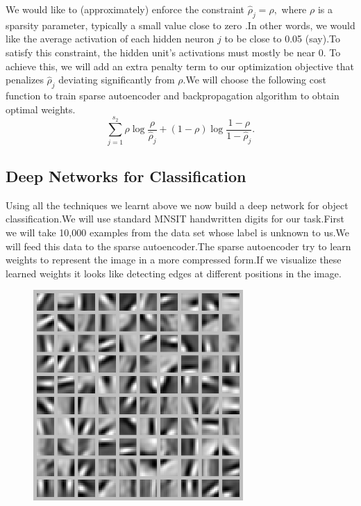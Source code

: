 \documentclass[18pt,letterpaper]{article}
\begin{document}
We would like to (approximately) enforce the constraint
$ \hat\rho_j = \rho,$
where $\textstyle \rho$ is a sparsity parameter, typically a small value close to zero
.In other words, we would like the average activation
of each hidden neuron $\textstyle j$ to be close to 0.05 (say).To satisfy this
constraint, the hidden unit's activations must mostly be near 0.
To achieve this, we will add an extra penalty term to our optimization objective that
penalizes $\textstyle \hat\rho_j$ deviating significantly from $\textstyle \rho$.We will choose the following cost function to train sparse autoencoder and backpropagation algorithm to obtain optimal weights.
$$
\sum_{j=1}^{s_2} \rho \log \frac{\rho}{\hat\rho_j} + (1-\rho) \log \frac{1-\rho}{1-\hat\rho_j}.
$$

\subsection{Deep Networks for Classification}
Using all the techniques we learnt above we now build a deep network for object classification.We will use standard MNSIT handwritten digits for our task.First we will take 10,000 examples from the data set whose label is unknown to us.We will feed this data to the sparse autoencoder.The sparse autoencoder try to learn weights to represent the image in a more compressed form.If we visualize these learned weights it looks like detecting edges at different positions in the image.

\begin{figure}[ht!]
\includegraphics[width=8cm]{6.png}
\end{figure}
\end{document}
